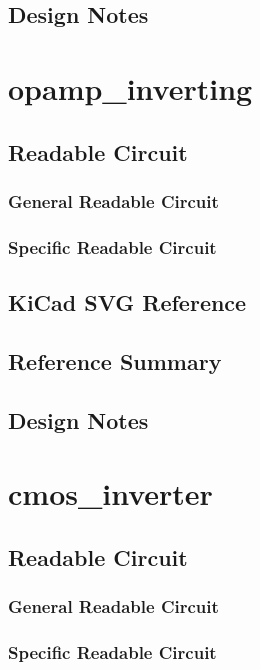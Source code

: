 \documentclass[11pt]{article}
\begin{document}
\subsection{Design Notes}

\clearpage
\section{opamp\_inverting}
\subsection{Readable Circuit}
\subsubsection{General Readable Circuit}

\subsubsection{Specific Readable Circuit}

\subsection{KiCad SVG Reference}
\subsection{Reference Summary}

\subsection{Design Notes}

\clearpage
\section{cmos\_inverter}
\subsection{Readable Circuit}
\subsubsection{General Readable Circuit}

\subsubsection{Specific Readable Circuit}

\end{document}
